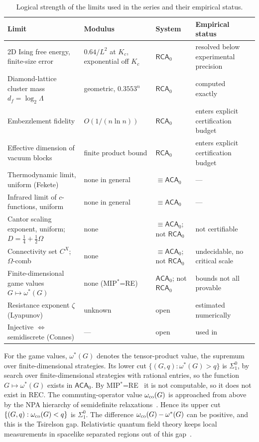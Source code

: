 \documentclass[11pt]{article}
\theoremstyle{definition}\newtheorem{definition}{Definition}[section]
\theoremstyle{remark}\newtheorem*{remark}{Remark}
\newcommand{\RCA}{\mathsf{RCA}_0}
\newcommand{\ACA}{\mathsf{ACA}_0}
\newcommand{\REC}{\mathrm{REC}}
\begin{document}
\begin{table}[ht]
\centering
\caption{Logical strength of the limits used in the series and their empirical status.}
\label{tab:class}
\small
\begin{tabular}{>{\raggedright\arraybackslash}p{4.6cm}>{\raggedright\arraybackslash}p{3.2cm}>{\raggedright\arraybackslash}p{2.2cm}>{\raggedright\arraybackslash}p{4.2cm}}
\toprule
Limit & Modulus & System & Empirical status \\
\midrule
2D Ising free energy, finite-size error & $0.64/L^2$ at $K_c$, exponential off $K_c$ & $\RCA$ & resolved below experimental precision~\cite{Chen2026_certify} \\
Diamond-lattice cluster mass $d_f=\log_2\Lambda$ & geometric, $0.3553^n$ & $\RCA$ & computed exactly~\cite{Chen2026_rg} \\
Embezzlement fidelity & $O(1/(n\ln n))$ & $\RCA$ & enters explicit certification budget~\cite{Chen2026_certify} \\
Effective dimension of vacuum blocks & finite product bound & $\RCA$ & enters explicit certification budget~\cite{Chen2026_qft} \\
\midrule
Thermodynamic limit, uniform (Fekete) & none in general & $\equiv\ACA$ & --- \\
Infrared limit of $c$-functions, uniform & none in general & $\equiv\ACA$ & --- \\
Cantor scaling exponent, uniform; $D=\tfrac14+\tfrac12\Omega$ & none & $\equiv\ACA$; not $\RCA$ & not certifiable~\cite{Chen2026_chaitin} \\
Connectivity set $C^X$; $\Omega$-comb & none & $\equiv\ACA$; not $\RCA$ & undecidable, no critical scale~\cite{Chen2026_fcu} \\
Finite-dimensional game values $G\mapsto\omega^*(G)$ & none (MIP$^*$=RE) & $\ACA$; not $\RCA$ & bounds not all provable~\cite{Chen2026_certify} \\
\midrule
Resistance exponent $\zeta$ (Lyapunov) & unknown & open & estimated numerically~\cite{Chen2026_rg} \\
Injective $\Leftrightarrow$ semidiscrete (Connes) & --- & open & used in~\cite{Chen2026_qft} \\
\bottomrule
\end{tabular}
\end{table}

For the game values, $\omega^*(G)$ denotes the tensor-product value, the supremum over finite-dimensional strategies. Its
lower cut $\{(G,q):\omega^*(G)>q\}$ is $\Sigma^0_1$, by search over finite-dimensional strategies with rational entries, so the function
$G\mapsto\omega^*(G)$ exists in $\ACA$. By MIP$^*$=RE~\cite{MIPRE} it is not computable, so it does not exist in $\REC$. The
commuting-operator value $\omega_{\rm co}(G)$ is approached from above by the NPA hierarchy of semidefinite
relaxations~\cite{NPA}. Hence its upper cut $\{(G,q):\omega_{\rm co}(G)<q\}$ is $\Sigma^0_1$. The difference $\omega_{\rm co}(G)-\omega^*(G)$ can be positive, and
this is the Tsirelson gap. Relativistic quantum field theory keeps local measurements in spacelike separated regions
out of this gap~\cite{Chen2026_qft}.
\end{document}
